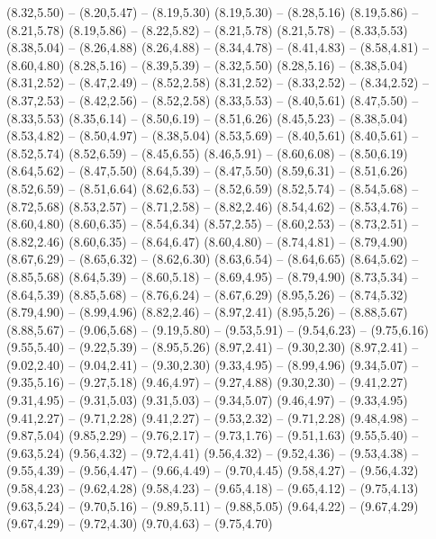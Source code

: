 {  (8.32,5.50) -- (8.20,5.47) -- (8.19,5.30)
  (8.19,5.30) -- (8.28,5.16)
  (8.19,5.86) -- (8.21,5.78)
  (8.19,5.86) -- (8.22,5.82) -- (8.21,5.78)
  (8.21,5.78) -- (8.33,5.53)
  (8.38,5.04) -- (8.26,4.88)
  (8.26,4.88) -- (8.34,4.78) -- (8.41,4.83) -- (8.58,4.81) -- (8.60,4.80)
  (8.28,5.16) -- (8.39,5.39) -- (8.32,5.50)
  (8.28,5.16) -- (8.38,5.04)
  (8.31,2.52) -- (8.47,2.49) -- (8.52,2.58)
  (8.31,2.52) -- (8.33,2.52) -- (8.34,2.52) -- (8.37,2.53) -- (8.42,2.56) -- (8.52,2.58)
  (8.33,5.53) -- (8.40,5.61)
  (8.47,5.50) -- (8.33,5.53)
  (8.35,6.14) -- (8.50,6.19) -- (8.51,6.26)
  (8.45,5.23) -- (8.38,5.04)
  (8.53,4.82) -- (8.50,4.97) -- (8.38,5.04)
  (8.53,5.69) -- (8.40,5.61)
  (8.40,5.61) -- (8.52,5.74)
  (8.52,6.59) -- (8.45,6.55)
  (8.46,5.91) -- (8.60,6.08) -- (8.50,6.19)
  (8.64,5.62) -- (8.47,5.50)
  (8.64,5.39) -- (8.47,5.50)
  (8.59,6.31) -- (8.51,6.26)
  (8.52,6.59) -- (8.51,6.64)
  (8.62,6.53) -- (8.52,6.59)
  (8.52,5.74) -- (8.54,5.68) -- (8.72,5.68)
  (8.53,2.57) -- (8.71,2.58) -- (8.82,2.46)
  (8.54,4.62) -- (8.53,4.76) -- (8.60,4.80)
  (8.60,6.35) -- (8.54,6.34)
  (8.57,2.55) -- (8.60,2.53) -- (8.73,2.51) -- (8.82,2.46)
  (8.60,6.35) -- (8.64,6.47)
  (8.60,4.80) -- (8.74,4.81) -- (8.79,4.90)
  (8.67,6.29) -- (8.65,6.32) -- (8.62,6.30)
  (8.63,6.54) -- (8.64,6.65)
  (8.64,5.62) -- (8.85,5.68)
  (8.64,5.39) -- (8.60,5.18) -- (8.69,4.95) -- (8.79,4.90)
  (8.73,5.34) -- (8.64,5.39)
  (8.85,5.68) -- (8.76,6.24) -- (8.67,6.29)
  (8.95,5.26) -- (8.74,5.32)
  (8.79,4.90) -- (8.99,4.96)
  (8.82,2.46) -- (8.97,2.41)
  (8.95,5.26) -- (8.88,5.67)
  (8.88,5.67) -- (9.06,5.68) -- (9.19,5.80) -- (9.53,5.91) -- (9.54,6.23) -- (9.75,6.16)
  (9.55,5.40) -- (9.22,5.39) -- (8.95,5.26)
  (8.97,2.41) -- (9.30,2.30)
  (8.97,2.41) -- (9.02,2.40) -- (9.04,2.41) -- (9.30,2.30)
  (9.33,4.95) -- (8.99,4.96)
  (9.34,5.07) -- (9.35,5.16) -- (9.27,5.18)
  (9.46,4.97) -- (9.27,4.88)
  (9.30,2.30) -- (9.41,2.27)
  (9.31,4.95) -- (9.31,5.03)
  (9.31,5.03) -- (9.34,5.07)
  (9.46,4.97) -- (9.33,4.95)
  (9.41,2.27) -- (9.71,2.28)
  (9.41,2.27) -- (9.53,2.32) -- (9.71,2.28)
  (9.48,4.98) -- (9.87,5.04)
  (9.85,2.29) -- (9.76,2.17) -- (9.73,1.76) -- (9.51,1.63)
  (9.55,5.40) -- (9.63,5.24)
  (9.56,4.32) -- (9.72,4.41)
  (9.56,4.32) -- (9.52,4.36) -- (9.53,4.38) -- (9.55,4.39) -- (9.56,4.47) -- (9.66,4.49) -- (9.70,4.45)
  (9.58,4.27) -- (9.56,4.32)
  (9.58,4.23) -- (9.62,4.28)
  (9.58,4.23) -- (9.65,4.18) -- (9.65,4.12) -- (9.75,4.13)
  (9.63,5.24) -- (9.70,5.16) -- (9.89,5.11) -- (9.88,5.05)
  (9.64,4.22) -- (9.67,4.29)
  (9.67,4.29) -- (9.72,4.30)
  (9.70,4.63) -- (9.75,4.70)
}
